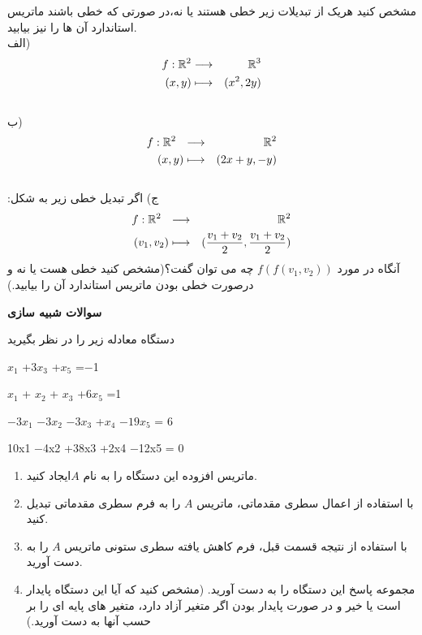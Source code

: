 \documentclass{article}
\begin{document}
مشخص کنید هریک از تبدیلات زیر خطی هستند یا نه،در صورتی که خطی باشند ماتریس استاندارد آن ها را نیز بیابید.\\

الف)
{\setlength\arraycolsep{0.1em}
	\begin{eqnarray*}
		f:{\Bbb R}^2&\longrightarrow& {\Bbb R}^3\\
		(x,y)&\longmapsto&(x^2,2y)
\end{eqnarray*}}
\\
ب) 
{\setlength\arraycolsep{0.1em}
	\begin{eqnarray*}
		f:{\Bbb R}^2\ \ &\longrightarrow&\ \ {\Bbb R}^2\\
		(x,y)&\longmapsto&(2x+y,-y)
\end{eqnarray*}}\\
ج) اگر تبدیل خطی زیر به شکل:
{\setlength\arraycolsep{0.1em}
	\begin{eqnarray*}
		f:{\Bbb R}^2\ \ &\longrightarrow&\ \ {\Bbb R}^2\\
		(v_1,v_2)&\longmapsto&(\frac{v_1+v_2}{2},\frac{v_1+v_2}{2})
\end{eqnarray*}}
آنگاه در مورد 
$f(f(v_1,v_2))$
چه می توان گفت؟(مشخص کنید خطی هست یا نه و درصورت خطی بودن ماتریس استاندارد آن را بیابید.)

\clearpage
{\LARGE{\textbf{سوالات شبیه سازی}}}


دستگاه معادله زیر را در نظر بگیرید

\begin{latin}
	$x_1$ +$3x_3$ +$x_5$ =−1
	
	 $x_1$ + $x_2$ + $x_3$ +$6x_5$ =1
	 
	  $−3x_1$ −$3x_2$ −$3x_3$ +$x_4$ −$19x_5$ = 6
	  
	   10x1 −4x2 +38x3 +2x4 −12x5 = 0
	\end{latin}
\begin{enumerate}
	\item
	ماتریس افزوده این دستگاه را به نام $A$ایجاد کنید.
	\item 
	با استفاده از اعمال سطری مقدماتی، ماتریس $A$ را به فرم سطری مقدماتی تبدیل کنید.
	\item 
با استفاده از نتیجه قسمت قبل، فرم کاهش یافته سطری ستونی ماتریس $A$  را به دست آورید.
\item 
مجموعه پاسخ این دستگاه را به دست آورید. (مشخص کنید که آیا این دستگاه پایدار است یا خیر و در صورت پایدار بودن اگر متغیر آزاد دارد، متغیر های پایه ای را بر حسب آنها به دست آورید.)
\end{enumerate}
\end{document}
